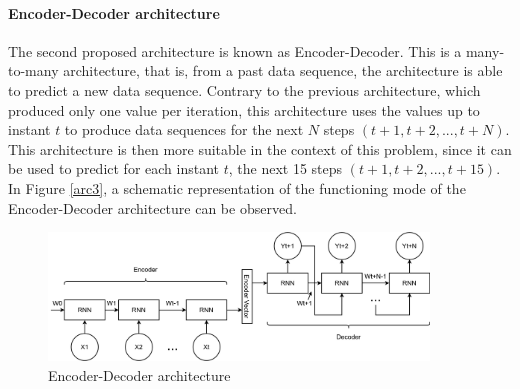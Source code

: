 \paragraph{Encoder-Decoder architecture}

The second proposed architecture is known as Encoder-Decoder. This is a many-to-many architecture, that is, from a past data sequence, the architecture is able to predict a new data sequence. Contrary to the previous architecture, which produced only one value per iteration, this architecture uses the values up to instant $t$ to produce data sequences for the next $N$ steps $(t+1, t+2, ..., t+N)$. This architecture is then more suitable in the context of this problem, since it can be used to predict for each instant $t$, the next 15 steps $(t+1, t+2, ..., t+15)$. In Figure \ref{arc3}, a schematic representation of the functioning mode of the Encoder-Decoder architecture can be observed. 

\begin{figure}[h!]
    \centering
    \begin{center}
    \includegraphics[width=0.9\textwidth]{Images/arc2.png}
    \caption{Encoder-Decoder architecture}
    \label{arc2}
    \end{center}
\end{figure}

